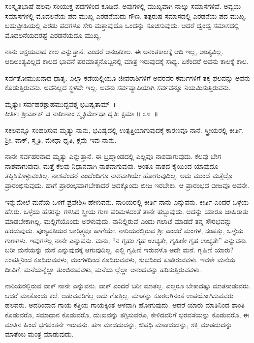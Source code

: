 ಸಂಸ್ಕೃತಭಾಷೆ ಹಲವು ಸಂಯುಕ್ತ ಪದಗಳಿಂದ ಕೂಡಿದೆ. ಅವುಗಳಲ್ಲಿ ಮುಖ್ಯವಾಗಿ ನಾಲ್ಕು ಸಮಾಸಗಳಿವೆ. ಅವ್ಯಯ ಸಮಾಸಗಳಲ್ಲಿ ಮೊದಲನೆಯ ಪದ ಮುಖ್ಯ ಎರಡನೆಯದು ಗೌಣ. ತತ್ಪರುಷ ಸಮಾಸದಲ್ಲಿ ಎರಡನೆಯ ಪದ ಮುಖ್ಯ. ಬಹುವ್ರೀಹಿಯಲ್ಲಿ ಎರಡು ಪದಗಳೂ ಸೇರಿ ಮತ್ತಾವುದೊ ಒಂದನ್ನು ಸೂಚಿಸುವುದು. ಆದರೆ ದ್ವಂದ್ವ ಸಮಾಸದಲ್ಲಿ ಮೊದಲನೆಯದರಷ್ಟೆ ಎರಡನೆಯದೂ ಮುಖ್ಯ.

ನಾನು ಅಕ್ಷಯವಾದ ಕಾಲ ಎನ್ನುತ್ತಾನೆ. ಎಂದರೆ ಅನಂತಕಾಲ. ಈ ಅನಂತಕಾಲಕ್ಕೆ ಆದಿ ಇಲ್ಲ, ಅಂತ್ಯವಿಲ್ಲ. ಆದಿಅಂತ್ಯವಿಲ್ಲದ ಕಾಲದ ಭಾವನೆ ಪರಮಾತ್ಮನೊಬ್ಬನಲ್ಲಿ ಮಾತ್ರ ಇರುವುದಕ್ಕೆ ಸಾಧ್ಯ. ಏಕೆಂದರೆ ಅವನು ಕಾಲಕ್ಕೆ ಕಾಲ.

ಸರ್ವತೋಮುಖನಾದ ಧಾತೃ. ಎಲ್ಲಾ ಕಡೆಯಲ್ಲಿಯೂ ಜೀವರಾಶಿಗಳಿಗೆ ಅವರವರ ಕರ್ಮಗಳಿಗೆ ತಕ್ಕ ಫಲವನ್ನು ಅವನು ಕೊಡುತ್ತಿರುವನು. ಅವನಿಲ್ಲದ ಸ್ಥಳವೇ ಇಲ್ಲ. ಅವನು ಸರ್ವವ್ಯಾಪಿಯಾಗಿ ಸರ್ವವನ್ನೂ ನಿಯಮಿಸುತ್ತಿರುವನು.

\begin{shloka}
ಮೃತ್ಯುಃ ಸರ್ವಹರಶ್ಚಾಹಮುದ್ಭವಶ್ಚ ಭವಿಷ್ಯತಾಮ್~।\\ಕೀರ್ತಿಃ ಶ‍್ರೀರ್ವಾಕ್ ಚ ನಾರೀಣಾಂ ಸ್ಮೃತಿರ್ಮೇಧಾ ಧೃತಿಃ ಕ್ಷಮಾ \hfill॥ ೩೪~॥
\end{shloka}

\begin{artha}
ಸಕಲವನ್ನೂ ಸಂಹರಿಸುವ ಮೃತ್ಯು ನಾನು, ಭವಿಷ್ಯದಲ್ಲಿ ಉತ್ಪತ್ತಿಯಾಗುವುದಕ್ಕೆ ಕಾರಣವೂ ನಾನೆ. ಸ್ತ್ರೀಯರಲ್ಲಿ ಕೀರ್ತಿ, ಶ‍್ರೀ, ವಾಕ್, ಸ್ಮೃತಿ, ಮೇಧಾ ಧೃತಿ, ಕ್ಷಮೆ ಇವು ನಾನು.
\end{artha}

ನಾನೇ ಸರ್ವಹರನಾದ ಮೃತ್ಯು ಎನ್ನುತ್ತಾನೆ. ಈ ಬ್ರಹ್ಮಾಂಡದಲ್ಲಿ ಎಲ್ಲವೂ ನಾಶವಾಗುವುದು. ಕೆಲವು ಬೇಗ ನಾಶವಾಗುವುವು. ಮತ್ತೆ ಕೆಲವು ನಿಧಾನವಾಗಿ ನಾಶವಾಗುವುವು. ಅಂತೂ ನಾಶದ ಕೈಯಿಂದ ಯಾವುದೂ ತಪ್ಪಿಸಿಕೊಳ್ಳುವಂತಿಲ್ಲ. ನಾಶವೆಂದರೆ ಎಂದೆಂದಿಗೂ ನಾಶವಾಗಿಯೇ ಹೋಗುವುದಿಲ್ಲ. ಅದು ಮುಂದೆ ಮತ್ತೆಲ್ಲೊ ಪ್ರಾರಂಭಿಸುವುದು. ಹಾಗೆ ಪ್ರಾರಂಭವಾಗಬೇಕಾದರೆ ಅದಕ್ಕೊಂದು ಬೀಜ ಇರಬೇಕು. ಆ ಪ್ರಾರಂಭದ ಬೀಜವೂ ಅವನೇ.

ಇನ್ನುಮೇಲೆ ಮನೆಯ ಒಳಗೆ ಪ್ರವೇಶಿಸಿ ಹೇಳುವನು. ನಾರಿಯರಲ್ಲಿ ಕೀರ್ತಿ ನಾನು ಎನ್ನುವನು. ಕೀರ್ತಿ ಎಂದರೆ ಒಳ್ಳೆಯ ಹೆಸರು. ಒಳ್ಳೆಯ ಹೆಸರನ್ನು ಗಳಿಸಿದ ಸ್ತ್ರೀಯ ಗುಣ ಪರಿಮಳದಂತೆ ತಾನೇ ಹಬ್ಬುವುದು. ಅದನ್ನು ಯಾರೂ ಜಾಹಿರಾತು ಮಾಡಬೇಕಾಗಿಲ್ಲ. ಮಲ್ಲಿಗೆಯೊಂದು ಅರಳುವುದು. ನಾನಿಲ್ಲಿರುವೆ ಎಂದು ಗಲಾಟೆ ಮಾಡದೆ ತನ್ನ ಸೌರಭವನ್ನು ಹರಡುವುದು. ಪುಣ್ಯವತಿಯರ ಚಾರಿತ್ರ್ಯವೂ ಹಾಗೆಯೇ. ನಾರಿಯರಲ್ಲಿರುವ ಶ‍್ರೀ ಎಂದರೆ ಮಂಗಳ, ಸಂಪತ್ತು, ಒಳ್ಳೆಯ ಗುಣಗಳು. ಇವುಗಳೆಲ್ಲ ನಾನೇ ಎನ್ನುವನು. ಮನು, “ನ ಗೃಹಂ ಗೃಹ ಉಚ್ಯತೇ, ಗೃಹಿಣೀ ಗೃಹ ಉಚ್ಯತೇ” ಎನ್ನುವನು. ಬರೀ ಮನೆಯನ್ನು ಮನೆ ಎನ್ನುವುದಕ್ಕೆ ಆಗುವುದಿಲ್ಲ, ಎಲ್ಲಿ ಗೃಹಿಣಿ ಇರುವಳೊ ಅದೇ ಮನೆ. ಗೃಹಿಣಿ ಯಾರು? ಸಂಪತ್ತಿನಿಂದ ಕೂಡಿರುವವಳು, ಮಂಗಳದಿಂದ ಕೂಡಿರುವವಳು, ಶುಭದಿಂದ ಕೂಡಿರುವವಳು. ಇವಳೇ ಮನೆಯ ದೀವಿಗೆ, ಮನೆಯನ್ನೆಲ್ಲಾ ತುಂಬಿರುವವಳು, ಮನೆಯ ಲ್ಲೆಲ್ಲಾ ಆನಂದವನ್ನು ಹರಿಸುತ್ತಿರುವವಳು.

ನಾರಿಯರಲ್ಲಿರುವ ವಾಕ್ ನಾನೇ ಎನ್ನುವನು. ವಾಕ್ ಎಂದರೆ ಬರೀ ಮಾತಲ್ಲ. ಎಲ್ಲರೂ ಬೇಕಾದಷ್ಟು ಮಾತನಾಡುವರು. ಆದರೆ ಮಾತೊಂದು ಕಲೆ. ಆಡುವವರಿಗೆಲ್ಲ ಅದು ಗೊತ್ತಿಲ್ಲ. ಮಾತನ್ನು ಕೂರಲಗಿನಂತೆ ಉಪಯೋಗಿಸುವವರು ಹಲವರು. ಅದರಿಂದಾದ ಗಾಯ ಕತ್ತಿಯ ಗಾಯಕ್ಕಿಂತ ಆಳವಾಗಿ ಹೋಗುವುದು. ಆದರೆ ಯಾರು ಮಾತಿನಿಂದ ಶಾಂತಿ ಕೊಡುವರೊ, ಸಮಾಧಾನ ಕೊಡುವರೊ, ದುಃಖವನ್ನು ತಗ್ಗಿಸುವರೊ, ಕೇಳಿದವರಿಗೆ ಭರವಸೆಯನ್ನು ಕೊಡುವರೊ, ಈ ಮಾತಿನ ಹಿಂದೆ ಭಗವಂತನೇ ಇರುವನು. ಹಣ ಮಾಡದುದನ್ನು, ಔಷಧಿ ಮಾಡದುದನ್ನು, ಶಕ್ತಿ ಮಾಡದುದನ್ನು ಮಾತೆಂಬ ಮಂತ್ರ ಮಾಡುವುದು.

